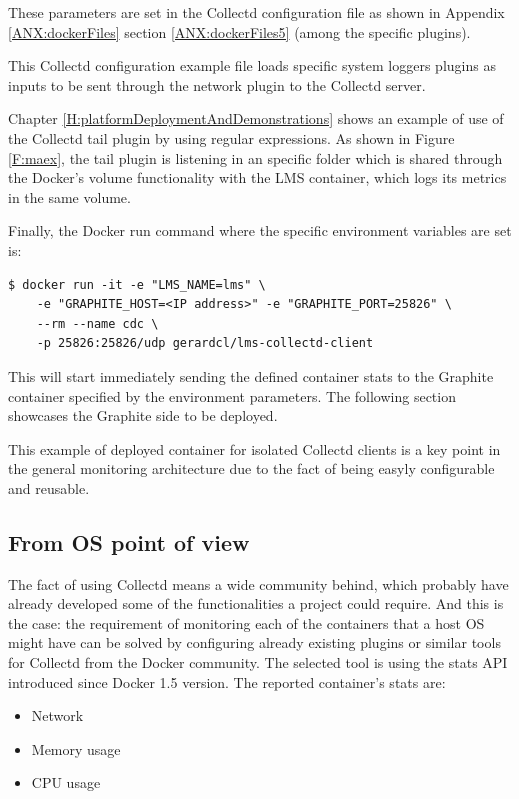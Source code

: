 These parameters are set in the Collectd configuration file as shown in Appendix \ref{ANX:dockerFiles} section \ref{ANX:dockerFiles5} (among the specific plugins).

This Collectd configuration example file loads specific system loggers plugins as inputs to be sent through the network plugin to the Collectd server.

Chapter \ref{H:platformDeploymentAndDemonstrations} shows an example of use of the Collectd tail plugin by using regular expressions. As shown in Figure \ref{F:maex}, the tail plugin is listening in an specific folder which is shared through the Docker's volume functionality with the LMS container, which logs its metrics in the same volume.

Finally, the Docker run command where the specific environment variables are set is:
\begin{verbatim}
$ docker run -it -e "LMS_NAME=lms" \
	-e "GRAPHITE_HOST=<IP address>" -e "GRAPHITE_PORT=25826" \
	--rm --name cdc \
	-p 25826:25826/udp gerardcl/lms-collectd-client
\end{verbatim}

This will start immediately sending the defined container stats to the Graphite container specified by the environment parameters. The following section showcases the Graphite side to be deployed.

This example of deployed container for isolated Collectd clients is a key point in the general monitoring architecture due to the fact of being easyly configurable and reusable.

\subsection{From OS point of view}

The fact of using Collectd means a wide community behind, which probably have already developed some of the functionalities a project could require. And this is the case: the requirement of monitoring each of the containers that a host OS might have can be solved by configuring already existing plugins or similar tools for Collectd from the Docker community. The selected tool is using the stats API introduced since Docker 1.5 version. The reported container's stats are:
 
\begin{itemize}
\item Network
\item Memory usage
\item CPU usage
\end{itemize}

